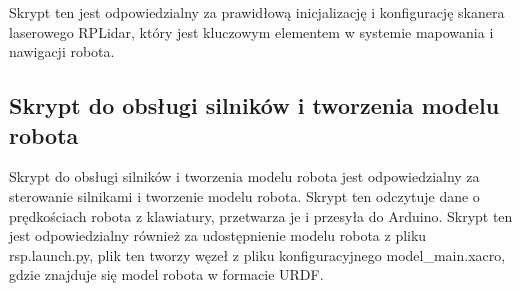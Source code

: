 \documentclass[a4paper,twoside,12pt]{book}
\begin{document}
Skrypt ten jest odpowiedzialny za prawidłową inicjalizację i konfigurację skanera laserowego RPLidar, który jest kluczowym elementem w systemie mapowania i nawigacji robota.
\newpage
\subsection{Skrypt do obsługi silników i tworzenia modelu robota}
Skrypt do obsługi silników i tworzenia modelu robota jest odpowiedzialny za sterowanie silnikami i tworzenie modelu robota. Skrypt ten odczytuje dane o prędkościach robota z klawiatury, przetwarza je i przesyła do Arduino. Skrypt ten jest odpowiedzialny również za udostępnienie modelu robota z pliku rsp.launch.py, plik ten tworzy węzeł z pliku konfiguracyjnego model\_main.xacro, gdzie znajduje się model robota w formacie URDF.
\end{document}
